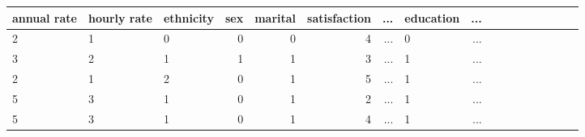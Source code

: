 \begin{tabular}{lllrrrrlrlrrrrrrr}
    \toprule
    annual rate & hourly rate & ethnicity & sex & marital & satisfaction & ... & education & ... \\
    \midrule
    2           & 1           & 0         & 0   & 0       & 4            & ... & 0         & ... \\
    3           & 2           & 1         & 1   & 1       & 3            & ... & 1         & ... \\
    2           & 1           & 2         & 0   & 1       & 5            & ... & 1         & ... \\
    5           & 3           & 1         & 0   & 1       & 2            & ... & 1         & ... \\
    5           & 3           & 1         & 0   & 1       & 4            & ... & 1         & ... \\
    \bottomrule
\end{tabular}
